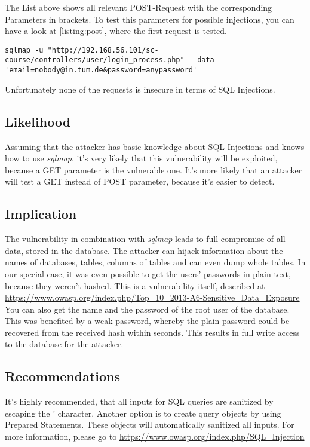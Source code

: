 The List above shows all relevant POST-Request with the corresponding Parameters in brackets. To test this parameters for possible injections, you can have a look at \ref{listing:post}, where the first request is tested.

\begin{lstlisting}[caption=Testing POST parameters for injections,label=listing:post]
sqlmap -u "http://192.168.56.101/sc-course/controllers/user/login_process.php" --data 'email=nobody@in.tum.de&password=anypassword'

\end{lstlisting}
Unfortunately none of the requests is insecure in terms of SQL Injections.

\subsection{Likelihood}
Assuming that the attacker has basic knowledge about SQL Injections and knows how to use \textit{sqlmap}, it's very likely that this vulnerability will be exploited, because a GET parameter is the vulnerable one. It's more likely that an attacker will test a GET instead of POST parameter, because it's easier to detect.


\subsection{Implication}
The vulnerability in combination with \textit{sqlmap} leads to full compromise of all data, stored in the database. The attacker can hijack information about the names of databases, tables, columns of tables and can even dump whole tables.  In our special case, it was even possible to get the users' passwords in plain text, because they weren't hashed. This is a vulnerability itself, described at \url{https://www.owasp.org/index.php/Top_10_2013-A6-Sensitive_Data_Exposure}
You can also get the name and the password of the root user of the database. This was benefited by a weak password, whereby the plain password could be recovered from the received hash within seconds. This results in full write access to the database for the attacker.


\subsection{Recommendations}
It's highly recommended, that all inputs for SQL queries are sanitized by escaping the ' character.
Another option is to create query objects by using  Prepared Statements.
These objects will automatically sanitized all inputs. For more information, please go to \url{https://www.owasp.org/index.php/SQL\_Injection}

